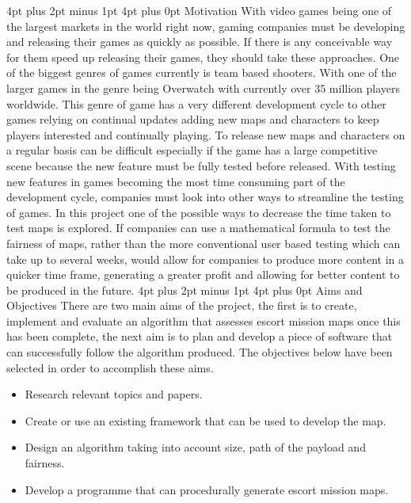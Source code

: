 \documentclass[12pt,a4paper,oneside]{book}
\makeatletter
\renewcommand\section{\@startsection {section}{1}{0mm} %
                               {4pt plus 2pt minus 1pt} %
                               {4pt plus 0pt} %
                               {\bfseries}}
\makeatother
\begin{document}
\section{Motivation}
With video games being one of the largest markets in the world right now, gaming companies must be developing and releasing their games as quickly as possible. If there is any conceivable way for them speed up releasing their games, they should take these approaches.
\vspace{5mm} 
\newline  
One of the biggest genres of games currently is team based shooters. With one of the larger games in the genre being Overwatch with currently over 35 million players worldwide.\cite{Overt} This genre of game has a very different development cycle to other games relying on continual updates adding new maps and characters to keep players interested and continually playing. To release new maps and characters on a regular basis can be difficult especially if the game has a large competitive scene because the new feature \vspace{5mm} must be fully tested before released.
\newline  
With testing new features in games becoming the most time consuming part of the development cycle, companies must look into other ways to streamline the testing of games. In this project one of the possible ways to decrease the time taken to test maps is explored. If companies can use a mathematical formula to test the fairness of maps, rather than the more conventional user based testing which can take up to several weeks, would allow for companies to produce more content in a quicker time frame, generating a greater profit and allowing for better content to be produced in the future. 
\vspace{5mm} 
\newline
\section{Aims and Objectives}
There are two main aims of the project, the first is to create, implement and evaluate an algorithm that assesses escort mission maps once this has been complete, the next aim is to plan and develop a piece of software that can successfully follow the algorithm produced. The objectives below have been selected in order to accomplish these aims.
\begin{itemize}
	\item Research relevant topics and papers.
	\item Create or use an existing framework that can be used to develop the map.
	\item Design an algorithm taking into account size, path of the payload and fairness. 
	\item Develop a programme that can procedurally generate escort mission maps.	
\end{itemize}
\vspace{5mm} 
\end{document}
